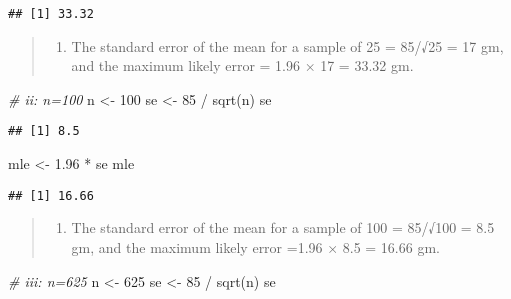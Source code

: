 \documentclass[
]{memoir}
\newenvironment{Shaded}{\begin{snugshade}}{\end{snugshade}}
\newcommand{\CommentTok}[1]{\textcolor[rgb]{0.56,0.35,0.01}{\textit{#1}}}
\newcommand{\DecValTok}[1]{\textcolor[rgb]{0.00,0.00,0.81}{#1}}
\newcommand{\FloatTok}[1]{\textcolor[rgb]{0.00,0.00,0.81}{#1}}
\newcommand{\FunctionTok}[1]{\textcolor[rgb]{0.00,0.00,0.00}{#1}}
\newcommand{\NormalTok}[1]{#1}
\newcommand{\OtherTok}[1]{\textcolor[rgb]{0.56,0.35,0.01}{#1}}
\newcommand{\SpecialCharTok}[1]{\textcolor[rgb]{0.00,0.00,0.00}{#1}}
\providecommand{\tightlist}{%
  \setlength{\itemsep}{0pt}\setlength{\parskip}{0pt}}
\begin{document}
\begin{verbatim}
## [1] 33.32
\end{verbatim}

\begin{quote}
\begin{enumerate}
\def\labelenumi{\roman{enumi})}
\tightlist
\item
  The standard error of the mean for a sample of 25 = 85/√25 = 17 gm, and the maximum likely error = 1.96 × 17 = 33.32 gm.
\end{enumerate}
\end{quote}

\begin{Shaded}
\begin{Highlighting}[]
\CommentTok{\# ii: n=100}
\NormalTok{n }\OtherTok{\textless{}{-}} \DecValTok{100}
\NormalTok{se }\OtherTok{\textless{}{-}} \DecValTok{85} \SpecialCharTok{/} \FunctionTok{sqrt}\NormalTok{(n)}
\NormalTok{se}
\end{Highlighting}
\end{Shaded}

\begin{verbatim}
## [1] 8.5
\end{verbatim}

\begin{Shaded}
\begin{Highlighting}[]
\NormalTok{mle }\OtherTok{\textless{}{-}} \FloatTok{1.96} \SpecialCharTok{*}\NormalTok{ se}
\NormalTok{mle}
\end{Highlighting}
\end{Shaded}

\begin{verbatim}
## [1] 16.66
\end{verbatim}

\begin{quote}
\begin{enumerate}
\def\labelenumi{\roman{enumi})}
\setcounter{enumi}{1}
\tightlist
\item
  The standard error of the mean for a sample of 100 = 85/√100 = 8.5 gm, and the maximum likely error =1.96 × 8.5 = 16.66 gm.
\end{enumerate}
\end{quote}

\begin{Shaded}
\begin{Highlighting}[]
\CommentTok{\# iii: n=625}
\NormalTok{n }\OtherTok{\textless{}{-}} \DecValTok{625}
\NormalTok{se }\OtherTok{\textless{}{-}} \DecValTok{85} \SpecialCharTok{/} \FunctionTok{sqrt}\NormalTok{(n)}
\NormalTok{se}
\end{Highlighting}
\end{Shaded}
\end{document}
